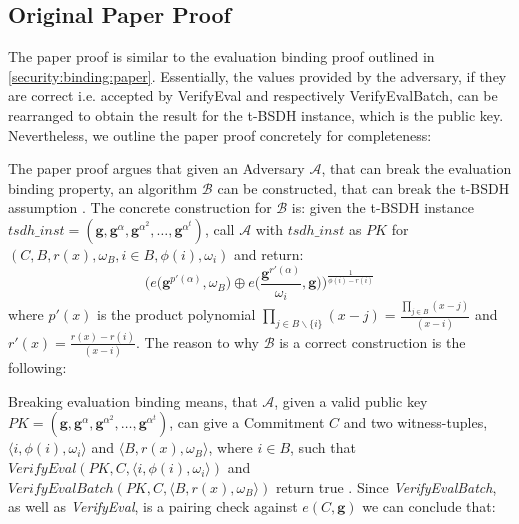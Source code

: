 \subsection{Original Paper Proof}
The paper proof is similar to the evaluation binding proof outlined in \ref{security:binding:paper}. Essentially, the values provided by the adversary, if they are correct i.e. accepted by VerifyEval and respectively VerifyEvalBatch, can be rearranged to obtain the result for the t-BSDH instance, which is the public key. Nevertheless, we outline the paper proof concretely for completeness:

The paper proof argues that given an Adversary $\mathcal{A}$, that can break the evaluation binding property, an algorithm $\mathcal{B}$ can be constructed, that can break the t-BSDH assumption \parencite{KZG}. The concrete construction for $\mathcal{B}$ is: given the t-BSDH instance $tsdh\_inst =(\mathbf{g}, \mathbf{g}^{\alpha}, \mathbf{g}^{\alpha^2},\dots, \mathbf{g}^{\alpha^t})$, call $\mathcal{A}$ with $tsdh\_inst$ as $PK$ for $(C,B, r(x), \omega_B, i \in B,\phi(i),\omega_i)$ and return: 
$$ \biggl(e\biggl(\mathbf{g}^{p'(\alpha)}, \omega_B\biggr) \oplus e\biggl(\frac{\mathbf{g}^{r'(\alpha)}}{\omega_i}, \mathbf{g}\biggr)\biggr)^{\frac{1}{\phi(i)-r(i)}}$$
where $p'(x)$ is the product polynomial $\prod_{j\in B\backslash\{i\}}^{}(x-j) = \frac{\prod_{j\in B}^{}(x-j)}{(x-i)}$ and $r'(x)=\frac{r(x)-r(i)}{(x-i)}$.
The reason to why $\mathcal{B}$ is a correct construction is the following: 

Breaking evaluation binding means, that $\mathcal{A}$, given a valid public key $PK=(\mathbf{g}, \mathbf{g}^{\alpha}, \mathbf{g}^{\alpha^2},\dots, \mathbf{g}^{\alpha^t})$, can give a Commitment $C$ and two witness-tuples, $\langle i, \phi(i),\omega_i\rangle$ and $\langle B, r(x), \omega_B\rangle$, where $i \in B$, such that $VerifyEval(PK, C,\langle i,\phi(i), \omega_i\rangle )$ and $VerifyEvalBatch(PK, C,\langle B,r(x), \omega_B\rangle )$ return true \parencite{KZG}. Since \textit{VerifyEvalBatch}, as well as \textit{VerifyEval}, is a pairing check against $e(C,\mathbf{g})$ we can conclude that: 


